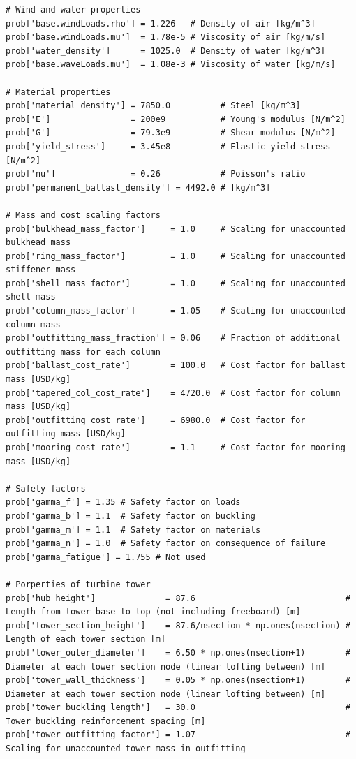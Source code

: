 \begin{lstlisting}
# Wind and water properties
prob['base.windLoads.rho'] = 1.226   # Density of air [kg/m^3]
prob['base.windLoads.mu']  = 1.78e-5 # Viscosity of air [kg/m/s]
prob['water_density']      = 1025.0  # Density of water [kg/m^3]
prob['base.waveLoads.mu']  = 1.08e-3 # Viscosity of water [kg/m/s]

# Material properties
prob['material_density'] = 7850.0          # Steel [kg/m^3]
prob['E']                = 200e9           # Young's modulus [N/m^2]
prob['G']                = 79.3e9          # Shear modulus [N/m^2]
prob['yield_stress']     = 3.45e8          # Elastic yield stress [N/m^2]
prob['nu']               = 0.26            # Poisson's ratio
prob['permanent_ballast_density'] = 4492.0 # [kg/m^3]

# Mass and cost scaling factors
prob['bulkhead_mass_factor']     = 1.0     # Scaling for unaccounted bulkhead mass
prob['ring_mass_factor']         = 1.0     # Scaling for unaccounted stiffener mass
prob['shell_mass_factor']        = 1.0     # Scaling for unaccounted shell mass
prob['column_mass_factor']       = 1.05    # Scaling for unaccounted column mass
prob['outfitting_mass_fraction'] = 0.06    # Fraction of additional outfitting mass for each column
prob['ballast_cost_rate']        = 100.0   # Cost factor for ballast mass [USD/kg]
prob['tapered_col_cost_rate']    = 4720.0  # Cost factor for column mass [USD/kg]
prob['outfitting_cost_rate']     = 6980.0  # Cost factor for outfitting mass [USD/kg]
prob['mooring_cost_rate']        = 1.1     # Cost factor for mooring mass [USD/kg]

# Safety factors
prob['gamma_f'] = 1.35 # Safety factor on loads
prob['gamma_b'] = 1.1  # Safety factor on buckling
prob['gamma_m'] = 1.1  # Safety factor on materials
prob['gamma_n'] = 1.0  # Safety factor on consequence of failure
prob['gamma_fatigue'] = 1.755 # Not used

# Porperties of turbine tower
prob['hub_height']              = 87.6                              # Length from tower base to top (not including freeboard) [m]
prob['tower_section_height']    = 87.6/nsection * np.ones(nsection) # Length of each tower section [m]
prob['tower_outer_diameter']    = 6.50 * np.ones(nsection+1)        # Diameter at each tower section node (linear lofting between) [m]
prob['tower_wall_thickness']    = 0.05 * np.ones(nsection+1)        # Diameter at each tower section node (linear lofting between) [m]
prob['tower_buckling_length']   = 30.0                              # Tower buckling reinforcement spacing [m]
prob['tower_outfitting_factor'] = 1.07                              # Scaling for unaccounted tower mass in outfitting


\end{lstlisting}
